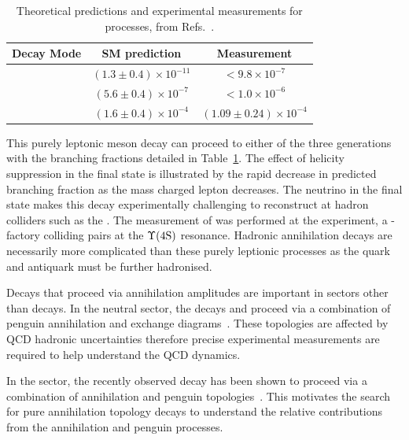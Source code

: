 \begin{table}[h]
   \begin{center}
      \begin{tabular}{lcc}
         \hline

         Decay Mode                 & SM prediction & Measurement \\
         \hline 
         \decay{\Bp}{\ep\neue}      & $(1.3\pm0.4)\times10^{-11}$           & $<9.8\times10^{-7}$\\
         \decay{\Bp}{\mup\neum}     & $(5.6\pm0.4)\times10^{-7}$            & $<1.0\times10^{-6}$\\
         \decay{\Bp}{\taup\neut}    & $(1.6\pm0.4)\times10^{-4}$&           $(1.09\pm0.24)\times 10^{-4}$ \\
         \hline
      \end{tabular}
   \end{center}
   \caption{Theoretical predictions and experimental measurements for \decay{\Bp}{\ellp\neul} processes, from Refs.~\cite{PhysRevD.92.051102,PhysRevD.79.091101,SATOYAMA200767}.}
   \label{tab:Theory_B2ellnu}
\end{table}
This purely leptonic \Bp meson decay can proceed to either of the three generations with the branching fractions detailed in Table~\ref{tab:Theory_B2ellnu}. The effect of helicity suppression in the final state is illustrated by the rapid decrease in predicted branching fraction as the mass charged lepton decreases. The neutrino in the final state makes this decay experimentally challenging to reconstruct at hadron colliders such as the \lhc. The measurement of \decay{\Bp}{\taup\neut} was performed at the \belle experiment, a \B-factory colliding \ep\en pairs at the $\Upsilon(\text{4S})$ resonance. 
Hadronic annihilation decays are necessarily more complicated than these purely leptionic processes as the quark and antiquark must be further hadronised.

Decays that proceed via annihilation amplitudes are important in sectors other than \Bp decays. In the neutral \B sector, the decays \decay{\Bz}{\Kp\Km} and \decay{\Bs}{\pip\pim} proceed via a combination of penguin annihilation and exchange diagrams~\cite{PhysRevLett.118.081801}. These topologies are affected by QCD hadronic uncertainties therefore precise experimental measurements are required to help understand the QCD dynamics.

In the \Bc sector, the recently observed \decay{\Bcp}{\Dz\Kp} decay has been shown to proceed via a combination of annihilation and penguin topologies~\cite{LHCb-PAPER-2016-058}. This motivates the search for pure annihilation topology decays to understand the relative contributions from the annihilation and penguin processes.

